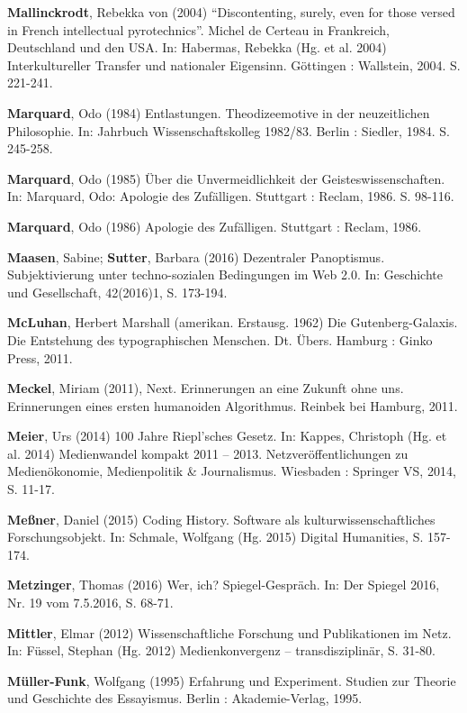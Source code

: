 \documentclass[a4paper,
fontsize=11pt,
oneside,
numbers=noperiodatend,
parskip=half-,
bibliography=totoc,
final
]{scrartcl}
\begin{document}
\textbf{Mallinckrodt}, Rebekka von (2004) \enquote{Discontenting,
surely, even for those versed in French intellectual pyrotechnics}.
Michel de Certeau in Frankreich, Deutschland und den USA. In: Habermas,
Rebekka (Hg. et al. 2004) Interkultureller Transfer und nationaler
Eigensinn. Göttingen : Wallstein, 2004. S. 221-241.

\textbf{Marquard}, Odo (1984) Entlastungen. Theodizeemotive in der
neuzeitlichen Philosophie. In: Jahrbuch Wissenschaftskolleg 1982/83.
Berlin : Siedler, 1984. S. 245-258.

\textbf{Marquard}, Odo (1985) Über die Unvermeidlichkeit der
Geisteswissenschaften. In: Marquard, Odo: Apologie des Zufälligen.
Stuttgart : Reclam, 1986. S. 98-116.

\textbf{Marquard}, Odo (1986) Apologie des Zufälligen. Stuttgart :
Reclam, 1986.

\textbf{Maasen}, Sabine; \textbf{Sutter}, Barbara (2016) Dezentraler
Panoptismus. Subjektivierung unter techno-sozialen Bedingungen im Web
2.0. In: Geschichte und Gesellschaft, 42(2016)1, S. 173-194.

\textbf{McLuhan}, Herbert Marshall (amerikan. Erstausg. 1962) Die
Gutenberg-Galaxis. Die Entstehung des typographischen Menschen. Dt.
Übers. Hamburg : Ginko Press, 2011.

\textbf{Meckel}, Miriam (2011), Next. Erinnerungen an eine Zukunft ohne
uns. Erinnerungen eines ersten humanoiden Algorithmus. Reinbek bei
Hamburg, 2011.

\textbf{Meier}, Urs (2014) 100 Jahre Riepl'sches Gesetz. In: Kappes,
Christoph (Hg. et al. 2014) Medienwandel kompakt 2011 -- 2013.
Netzveröffentlichungen zu Medienökonomie, Medienpolitik \& Journalismus.
Wiesbaden : Springer VS, 2014, S. 11-17.

\textbf{Meßner}, Daniel (2015) Coding History. Software als
kulturwissenschaftliches Forschungsobjekt. In: Schmale, Wolfgang (Hg.
2015) Digital Humanities, S. 157-174.

\textbf{Metzinger}, Thomas (2016) Wer, ich? Spiegel-Gespräch. In: Der
Spiegel 2016, Nr. 19 vom 7.5.2016, S. 68-71.

\textbf{Mittler}, Elmar (2012) Wissenschaftliche Forschung und
Publikationen im Netz. In: Füssel, Stephan (Hg. 2012) Medienkonvergenz
-- transdisziplinär, S. 31-80.

\textbf{Müller-Funk}, Wolfgang (1995) Erfahrung und Experiment. Studien
zur Theorie und Geschichte des Essayismus. Berlin : Akademie-Verlag,
1995.
\end{document}
